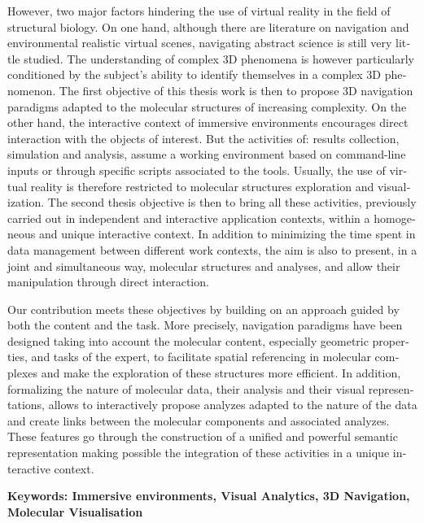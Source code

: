 \begin{otherlanguage}{english}
However, two major factors hindering the use of virtual reality in the field of structural biology. On one hand, although there are literature on navigation and environmental realistic virtual scenes, navigating abstract science is still very little studied. The understanding of complex 3D phenomena is however particularly conditioned by the subject's ability to identify themselves in a complex 3D phenomenon. The first objective of this thesis work is then to propose 3D navigation paradigms adapted to the molecular structures of increasing complexity. On the other hand, the interactive context of immersive environments encourages direct interaction with the objects of interest. But the activities of: results collection, simulation and analysis, assume a working environment based on command-line inputs or through specific scripts associated to the tools. Usually, the use of virtual reality is therefore restricted to molecular structures exploration and visualization. The second thesis objective is then to bring all these activities, previously carried out in independent and interactive application contexts, within a homogeneous and unique interactive context. In addition to minimizing the time spent in data management between different work contexts, the aim is also to present, in a joint and simultaneous way, molecular structures and analyses, and allow their manipulation through direct interaction.

Our contribution meets these objectives by building on an approach guided by both the content and the task. More precisely, navigation paradigms have been designed taking into account the molecular content, especially geometric properties, and tasks of the expert, to facilitate spatial referencing in molecular complexes and make the exploration of these structures more efficient. In addition, formalizing the nature of molecular data, their analysis and their visual representations, allows to interactively propose analyzes adapted to the nature of the data and create links between the molecular components and associated analyzes. These features go through the construction of a unified and powerful semantic representation making possible the integration of these activities in a unique interactive context.

\textbf{Keywords: Immersive environments, Visual Analytics, 3D Navigation, Molecular Visualisation} 

\end{otherlanguage} 